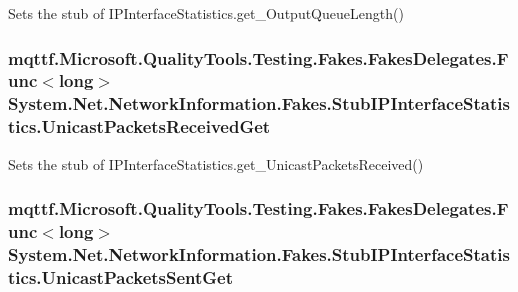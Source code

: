 Sets the stub of I\-P\-Interface\-Statistics.\-get\-\_\-\-Output\-Queue\-Length()

\hypertarget{class_system_1_1_net_1_1_network_information_1_1_fakes_1_1_stub_i_p_interface_statistics_a6ddd27f6bbccb24102084e085a1533ab}{
\subsubsection[{Unicast\-Packets\-Received\-Get}]{\setlength{\rightskip}{0pt plus 5cm}mqttf.\-Microsoft.\-Quality\-Tools.\-Testing.\-Fakes.\-Fakes\-Delegates.\-Func$<$long$>$ System.\-Net.\-Network\-Information.\-Fakes.\-Stub\-I\-P\-Interface\-Statistics.\-Unicast\-Packets\-Received\-Get}}\label{class_system_1_1_net_1_1_network_information_1_1_fakes_1_1_stub_i_p_interface_statistics_a6ddd27f6bbccb24102084e085a1533ab}


Sets the stub of I\-P\-Interface\-Statistics.\-get\-\_\-\-Unicast\-Packets\-Received()

\hypertarget{class_system_1_1_net_1_1_network_information_1_1_fakes_1_1_stub_i_p_interface_statistics_a11773f4540f065bce15428347c633487}{
\subsubsection[{Unicast\-Packets\-Sent\-Get}]{\setlength{\rightskip}{0pt plus 5cm}mqttf.\-Microsoft.\-Quality\-Tools.\-Testing.\-Fakes.\-Fakes\-Delegates.\-Func$<$long$>$ System.\-Net.\-Network\-Information.\-Fakes.\-Stub\-I\-P\-Interface\-Statistics.\-Unicast\-Packets\-Sent\-Get}}\label{class_system_1_1_net_1_1_network_information_1_1_fakes_1_1_stub_i_p_interface_statistics_a11773f4540f065bce15428347c633487}


